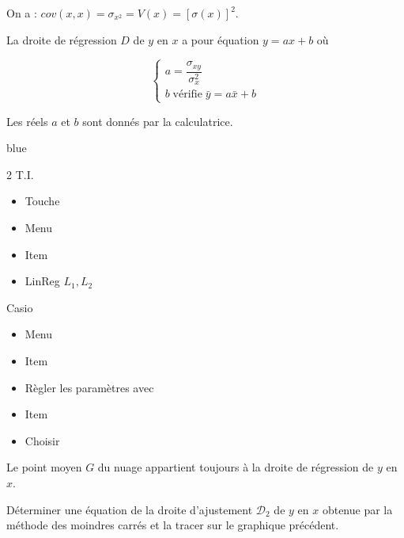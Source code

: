 \documentclass[french]{book}
\newcommand{\Syst}[2]{\left\{\begin{array}{lcccc} #1 \\ #2 \end{array}\right.}
\begin{document}
\begin{rem}
   On a : \quad $cov(x,x)=\sigma_{x^2}=V(x)=[\sigma(x)]^2$.
\end{rem}



\begin{prop}
   La droite de régression $D$ de $y$ en $x$ a pour équation $y=ax+b$ où 
   
  
  $$\Syst{a=\dfrac{\sigma_{xy}}{\sigma_{x}^2}}{b \; \text{vérifie} \; \bar y = a\bar x +b}$$
\end{prop}

\begin{rem}
   Les réels $a$ et $b$ sont donnés par la calculatrice.
\end{rem}

\begin{color}{blue}
\begin{multicols}{2}
   T.I.
   \begin{itemize}
      \item[$\bullet$] Touche 
      \item[$\bullet$] Menu 
      \item[$\bullet$] Item 
      \item[$\bullet$] LinReg $L_1,L_2$ \\
   \end{itemize}
   Casio
   \begin{itemize}
      \item[$\bullet$] Menu 
      \item[$\bullet$] Item 
      \item[$\bullet$] Règler les paramètres avec
      \item[$\bullet$] Item 
      \item[$\bullet$] Choisir 
   \end{itemize}
\end{multicols}
\end{color}



\begin{prop}
   Le point moyen $G$ du nuage appartient toujours à la droite de régression de $y$ en $x$.
\end{prop}



\begin{exemple}
   Déterminer une équation de la droite d'ajustement $\mathcal{D}_2$ de $y$ en $x$ obtenue par la méthode des moindres carrés et la tracer sur le graphique précédent.
\end{exemple}
\end{document}
